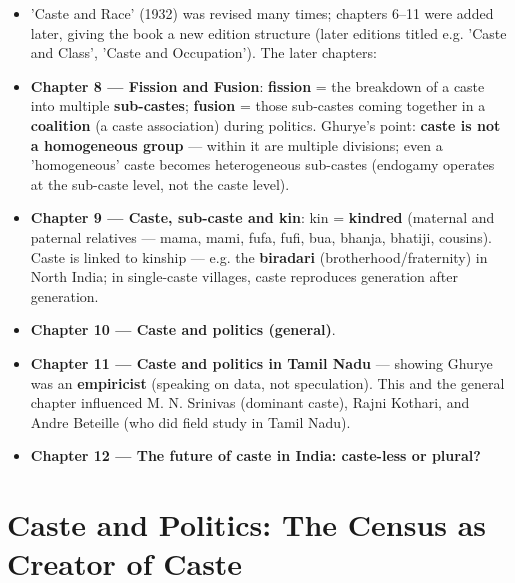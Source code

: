 \begin{KeyConcept}
\begin{itemize}
\item 'Caste and Race' (1932) was revised many times; chapters 6--11 were added later, giving the book a new edition structure (later editions titled e.g. 'Caste and Class', 'Caste and Occupation'). The later chapters:
\item \textbf{Chapter 8 --- Fission and Fusion}: \textbf{fission} = the breakdown of a caste into multiple \textbf{sub-castes}; \textbf{fusion} = those sub-castes coming together in a \textbf{coalition} (a caste association) during politics. Ghurye's point: \textbf{caste is not a homogeneous group} --- within it are multiple divisions; even a 'homogeneous' caste becomes heterogeneous sub-castes (endogamy operates at the sub-caste level, not the caste level).
\item \textbf{Chapter 9 --- Caste, sub-caste and kin}: kin = \textbf{kindred} (maternal and paternal relatives --- mama, mami, fufa, fufi, bua, bhanja, bhatiji, cousins). Caste is linked to kinship --- e.g. the \textbf{biradari} (brotherhood/fraternity) in North India; in single-caste villages, caste reproduces generation after generation.
\item \textbf{Chapter 10 --- Caste and politics (general)}.
\item \textbf{Chapter 11 --- Caste and politics in Tamil Nadu} --- showing Ghurye was an \textbf{empiricist} (speaking on data, not speculation). This and the general chapter influenced M. N. Srinivas (dominant caste), Rajni Kothari, and Andre Beteille (who did field study in Tamil Nadu).
\item \textbf{Chapter 12 --- The future of caste in India: caste-less or plural?}
\end{itemize}
\end{KeyConcept}

\section{Caste and Politics: The Census as Creator of Caste}

